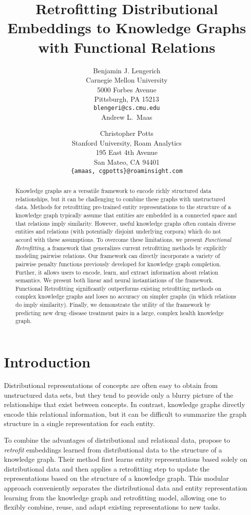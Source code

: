 \documentclass[11pt, a4paper]{article}
\title{Retrofitting Distributional Embeddings to Knowledge Graphs\\ with Functional Relations}
\author{Benjamin J. Lengerich \\
  Carnegie Mellon University \\
  5000 Forbes Avenue \\
  Pittsburgh, PA 15213 \\
  {\tt blengeri@cs.cmu.edu} \\\And
  Andrew L.~Maas \and Christopher Potts \\
  Stanford University, Roam Analytics \\
  195 East 4th Avenue \\
  San Mateo, CA 94401 \\
  {\tt {\{amaas, cgpotts\}}@roaminsight.com} \\
  }
\date{}
\begin{document}
\maketitle
\begin{abstract}
Knowledge graphs are a versatile framework to encode richly structured data relationships, but it can be challenging to combine these graphs with unstructured data. Methods for retrofitting pre-trained entity representations to the structure of a knowledge graph typically assume that entities are embedded in a connected space and that relations imply similarity. However, useful knowledge graphs often contain diverse entities and relations (with potentially disjoint underlying corpora) which do not accord with these assumptions. To overcome these limitations, we present \textit{Functional Retrofitting}, a framework that generalizes current retrofitting methods by explicitly modeling pairwise relations. Our framework can directly incorporate a variety of pairwise penalty functions previously developed for knowledge graph completion. Further, it allows users to encode, learn, and extract information about relation semantics. We present both linear and neural instantiations of the framework. Functional Retrofitting significantly outperforms existing retrofitting methods on complex knowledge graphs and loses no accuracy on simpler graphs (in which relations do imply similarity). Finally, we demonstrate the utility of the framework by predicting new drug--disease treatment pairs in a large, complex health knowledge graph.
\end{abstract}


\section{Introduction}
Distributional representations of concepts are often easy to obtain from unstructured data sets, but they tend to provide only a blurry picture of the relationships that exist between concepts. In contrast, knowledge graphs directly encode this relational information, but it can be difficult to summarize the graph structure in a single representation for each entity.

To combine the advantages of distributional and relational data,  propose to \textit{retrofit} embeddings learned from distributional data to the structure of a knowledge graph. Their method first learns entity representations based solely on distributional data and then applies a retrofitting step to update the representations based on the structure of a knowledge graph. This modular approach conveniently separates the distributional data and entity representation learning from the knowledge graph and retrofitting model, allowing one to flexibly combine, reuse, and adapt existing representations to new tasks.
\end{document}
